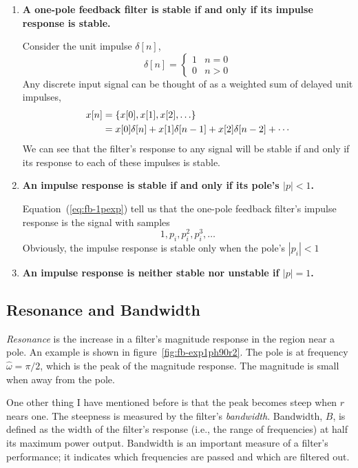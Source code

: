 \begin{enumerate}
\item \textbf{A one-pole feedback filter is stable if and only if its
impulse response is stable.}

Consider the unit impulse $\delta[n]$,
\begin{equation}
\delta[n] = 
\left\{\begin{array}{rl}
1 & n=0\\
0 & n>0
\end{array}\right.
\end{equation}
Any discrete input signal can be thought of as a weighted sum of
delayed unit impulses,
\begin{align}
x[n] &= \{x[0], x[1], x[2], \ldots\} \notag \\
     &= x[0]\delta[n] + x[1]\delta[n-1] + x[2]\delta[n-2] + \cdots
\end{align}
We can see that the filter's response to any signal will be stable if
and only if its response to each of these impulses is stable.

\item \textbf{An impulse response is stable if and only if its pole's
$|p|<1$.}

Equation~(\ref{eq:fb-1pexp}) tell us that the 
one-pole feedback filter's impulse response is the signal with samples
\begin{equation}
1, p_i, p_i^2, p_i^3, \ldots
\end{equation}
Obviously, the impulse response is stable only when the pole's $|p_i|<1$

\item \textbf{An impulse response is neither stable nor unstable if
$|p|=1$.}
\end{enumerate}

\subsection{Resonance and Bandwidth}

\emph{Resonance} is the increase in a filter's magnitude response in
the region near a pole. An example is shown in
figure~\ref{fig:fb-exp1ph90r2}. The pole is at frequency
$\hat{\omega}=\pi/2$, which is the peak of the magnitude response. The
magnitude is small when away from the pole.

One other thing I have mentioned before is that the peak becomes steep
when $r$ nears one. The steepness is measured by the filter's
\emph{bandwidth}.
Bandwidth, $B$, is defined as the width of the
filter's response (i.e., the range of frequencies) at half its maximum
power output. Bandwidth is an important measure of a filter's
performance; it indicates which frequencies are passed and which are
filtered out.

